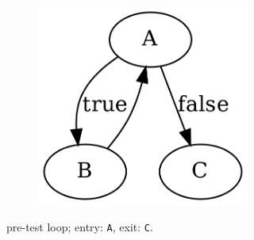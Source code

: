 \begin{savenotes}
\begin{figure}[htbp]
\begin{subfigure}[ht]{0.32\textwidth}
\begin{subfigure}[ht]{0.50\textwidth}
				\includegraphics[width=\textwidth]{inc/primitives/pre_loop.png}
			\end{subfigure}
			\caption{pre-test loop; entry: \texttt{A}, exit: \texttt{C}.}
			\label{fig:pre_loop_graph_representation}
		\end{subfigure}
		\qquad
		\begin{subfigure}[ht]{0.30\textwidth}
			\centering
			\begin{subfigure}[ht]{0.50\textwidth}
				
			\end{subfigure}
			\begin{subfigure}[ht]{0.35\textwidth}

\end{subfigure}
\end{subfigure}
\end{figure}
\end{savenotes}
